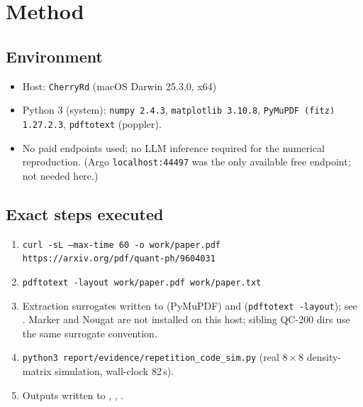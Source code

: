 \documentclass[11pt]{article}
\begin{document}
\section{Method}
\label{sec:method}

\subsection{Environment}
\begin{itemize}
    \item Host: \texttt{CherryRd} (macOS Darwin 25.3.0, x64)
    \item Python 3 (system): \texttt{numpy 2.4.3}, \texttt{matplotlib
    3.10.8}, \texttt{PyMuPDF (fitz) 1.27.2.3}, \texttt{pdftotext} (poppler).
    \item No paid endpoints used; no LLM inference required for the
    numerical reproduction. (Argo \texttt{localhost:44497} was the only
    available free endpoint; not needed here.)
\end{itemize}

\subsection{Exact steps executed}
\begin{enumerate}
    \item \texttt{curl -sL --max-time 60 -o work/paper.pdf https://arxiv.org/pdf/quant-ph/9604031}
    \item \texttt{pdftotext -layout work/paper.pdf work/paper.txt}
    \item Extraction surrogates written to 
    (PyMuPDF) and  (\texttt{pdftotext -layout});
    see . Marker and Nougat are not installed
    on this host; sibling QC-200 dirs use the same surrogate convention.
    \item \texttt{python3 report/evidence/repetition\_code\_sim.py}
    (real $8\times 8$ density-matrix simulation, wall-clock 82\,s).
    \item Outputs written to ,
    , .
\end{enumerate}
\end{document}
